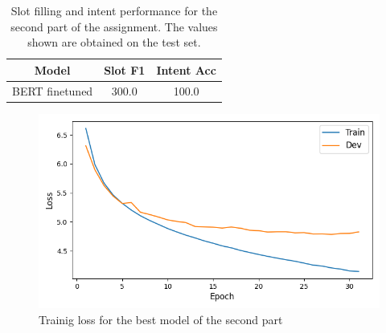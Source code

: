 \documentclass[a4paper]{article}
\begin{document}
\begin{table}[h]
  \centering
  \begin{tabular}{|c|c|c|}
    \hline
    \textbf{Model} & \textbf{Slot F1} & \textbf{Intent Acc} \\
    \hline
    BERT finetuned& 300.0 & 100.0 \\
    \hline
  \end{tabular}
  \caption{Slot filling and intent performance for the second part of the assignment. The values shown are obtained on the test set.}
  \label{tab:results2}
\end{table}

\begin{figure}[h]
  \includegraphics[width=\linewidth]{./images/plot_2_loss.png}
  \caption{Trainig loss for the best model of the second part}
  \label{fig:fig2}
\end{figure}





\end{document}
